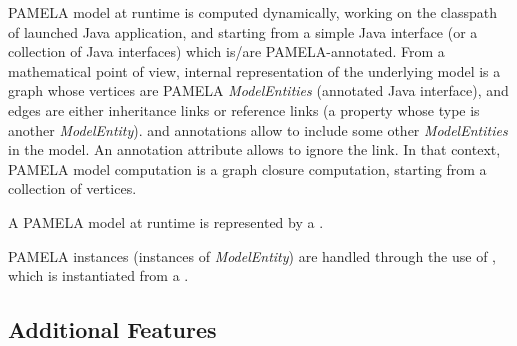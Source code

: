 PAMELA model at runtime is computed dynamically, working on the classpath of
launched Java application, and starting from a simple Java interface (or a
collection of Java interfaces) which is/are PAMELA-annotated. From a
mathematical point of view, internal representation of the underlying model is
a graph whose vertices are PAMELA \emph{ModelEntities} (annotated Java
interface), and edges are either inheritance links or reference links (a
property whose type is another \emph{ModelEntity}).  and
   annotations allow to include some other
  \emph{ModelEntities} in the model. An annotation attribute
   allows to ignore the link. In that
  context, PAMELA model computation is a graph closure computation, starting
  from a collection of vertices.

A PAMELA model at runtime is represented by a .

PAMELA instances (instances of \emph{ModelEntity}) are handled through the use of , which is instantiated from a .


\subsection{Additional Features}

